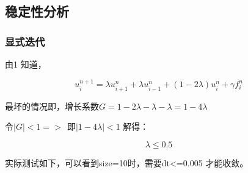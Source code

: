 \documentclass[10pt, a4paper]{article}
\begin{document}
\subsection{稳定性分析}
\subsubsection{显式迭代}
由1 知道，

$$
u_i^{n+1}=
\lambda u^n_{i+1}+\lambda u^n_{i-1}+({1}-2\lambda)u_i^n
+\gamma f^n_i
$$

最坏的情况即，增长系数$G=1-2\lambda-\lambda-\lambda =1-4\lambda$ 

令$|G|<1=> ~~即|1-4\lambda|<1$ 解得：

$$
\lambda\le 0.5
$$

实际测试如下，可以看到size=10时，需要dt<=0.005 才能收敛。
\end{document}
